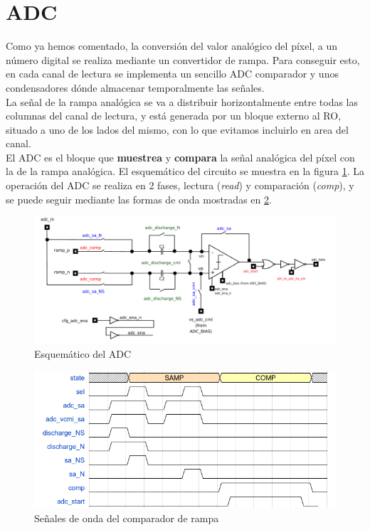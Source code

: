 \section{ADC}\label{cap:ro_sch_adc}

Como ya hemos comentado, la conversión del valor analógico del píxel, a un número
digital se realiza mediante un convertidor de rampa. Para conseguir esto,
en cada canal de lectura se implementa un sencillo ADC comparador y unos condensadores
dónde almacenar temporalmente las señales.\\

La señal de la rampa analógica se va a distribuir horizontalmente entre todas las
columnas del canal de lectura, y está generada por un bloque externo al RO, situado
a uno de los lados del mismo, con lo que evitamos incluirlo en area del canal.\\

El ADC es el bloque que \textbf{muestrea} y \textbf{compara} la señal analógica del píxel con la de la
rampa analógica. El esquemático del circuito se muestra en la figura \ref{fig:adc_sch}.
La operación del ADC se realiza en 2 fases, lectura (\textit{read}) y comparación
(\textit{comp}), y se puede seguir mediante las formas de onda mostradas en \ref{fig:adc_wave}.\\

\begin{figure}[h]
	\includegraphics[width=\textwidth]{svg/adc_sch.pdf}
	\caption{Esquemático del ADC}
	\label{fig:adc_sch}
\end{figure}

\begin{figure}[h]
	\includegraphics[width=\textwidth]{img/adc_wave.png}
	\caption{Señales de onda del comparador de rampa}
	\label{fig:adc_wave}
\end{figure}

